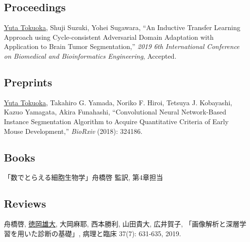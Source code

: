 \documentclass[letterpaper]{article}
\renewenvironment{itemize}{
  \begin{list}{}{
    \setlength{\leftmargin}{1.5em}
  }
}{
  \end{list}
}
\begin{document}
\subsection*{\bf Proceedings}

\begin{itemize}
 \item \underline{Yuta Tokuoka}, Shuji Suzuki, Yohei Sugawara,
       ``An Inductive Transfer Learning Approach using Cycle-consistent Adversarial Domain Adaptation with Application to Brain Tumor Segmentation,''
       {\itshape 2019 6th International Conference on Biomedical and Bioinformatics Engineering}, Accepted.
\end{itemize}


\subsection*{\bf Preprints}

\begin{itemize}
 \item \underline{Yuta Tokuoka}, Takahiro G. Yamada, Noriko F. Hiroi,
       Tetsuya J. Kobayashi, Kazuo Yamagata, Akira Funahashi,
       ``Convolutional Neural Network-Based Instance Segmentation Algorithm
       to Acquire Quantitative Criteria of Early Mouse Development,''
       {\itshape BioRxiv} (2018): 324186.
\end{itemize}


\subsection*{\bf Books}

\begin{itemize}
 \item 「数でとらえる細胞生物学」舟橋啓 監訳, 第4章担当
\end{itemize}


\subsection*{\bf Reviews}

\begin{itemize}
 \item 舟橋啓, \underline{徳岡雄大}, 大岡麻耶, 西本勝利, 山田貴大, 広井賀子,
       「画像解析と深層学習を用いた診断の基礎」, 病理と臨床 37(7): 631-635, 2019.
\end{itemize}
\end{document}
